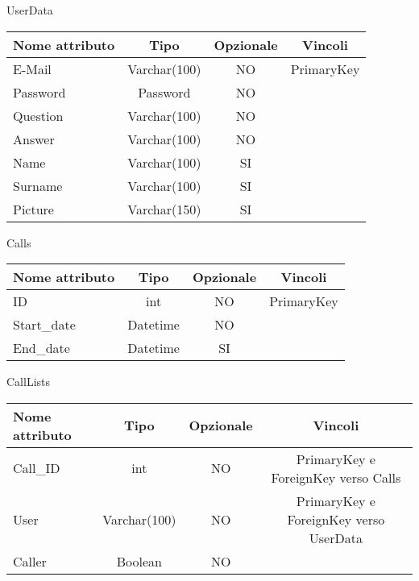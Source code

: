 \begin{center}

UserData

\begin{center}
\begin{tabular}{lccc}
\toprule
Nome attributo & Tipo & Opzionale & Vincoli\\
\midrule %
E-Mail & Varchar(100) & NO & PrimaryKey\\
Password & Password & NO &\\
Question & Varchar(100) & NO &\\
Answer & Varchar(100) & NO &\\
Name & Varchar(100) & SI &\\
Surname & Varchar(100) & SI &\\
Picture & Varchar(150) & SI &\\
\bottomrule
\end{tabular}
\end{center}

Calls

\begin{center}
\begin{tabular}{lccc}
\toprule
Nome attributo & Tipo & Opzionale & Vincoli\\
\midrule %
ID & int & NO & PrimaryKey\\
Start\_date & Datetime & NO & \\
End\_date & Datetime & SI &\\
\bottomrule
\end{tabular}
\end{center}

CallLists

\begin{center}
\begin{tabular}{lccc}
\toprule
Nome attributo & Tipo & Opzionale & Vincoli\\
\midrule %
Call\_ID & int & NO & PrimaryKey e ForeignKey verso Calls\\
User & Varchar(100) & NO & PrimaryKey e ForeignKey verso UserData \\
Caller & Boolean & NO &\\
\bottomrule
\end{tabular}
\end{center}


\end{center}
